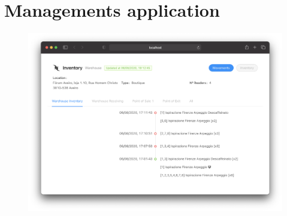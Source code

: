 \section{Managements application}

\begin{figure}
  \centering
  \includegraphics[width=\textwidth]{figs/webmanagement.png}
  \caption{}
  \label{fig:webinterface}
\end{figure}